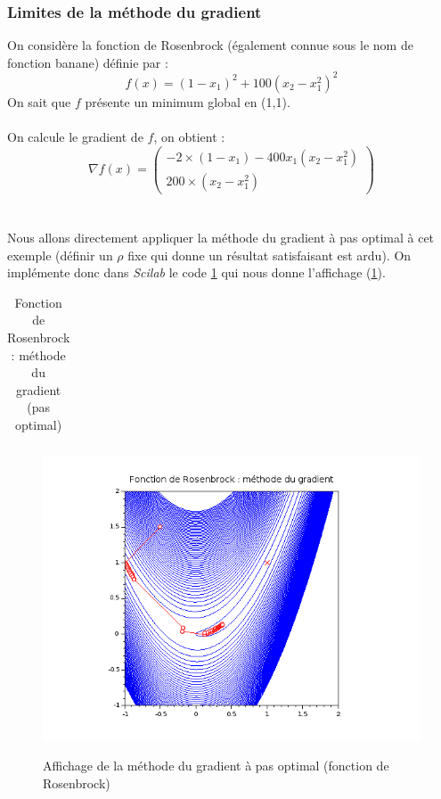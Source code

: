 \documentclass[a4paper,10pt]{report}
\begin{document}
\subsubsection{Limites de la méthode du gradient}
On considère la fonction de Rosenbrock (également connue sous le nom de fonction banane) définie par :
\abovedisplayskip=0mm
\begin{displaymath}
f(x) = (1-x_1)^2 + 100(x_2-x_1^2)^2
\end{displaymath}
On sait que $f$ présente un minimum global en (1,1).\\ \\
On calcule le gradient de $f$, on obtient :
\abovedisplayskip=0mm
\begin{displaymath}
\nabla f(x) = \left( \begin{array}{c} -2\times(1-x_1)-400x_1(x_2-x_1^2) \\ 200\times(x_2-x_1^2) \end{array} \right)
\end{displaymath}
\\ \\
Nous allons directement appliquer la méthode du gradient à pas optimal à cet exemple (définir un $\rho$ fixe qui donne un résultat satisfaisant est ardu). On implémente donc dans \textit{Scilab} le code \ref{banana_gradient} qui nous donne l'affichage (\ref{banana_graph1}).

\begin{table}[H]
\caption{Fonction de Rosenbrock : méthode du gradient (pas optimal)}
\begin{tabular}{l}

\label{banana_gradient}
\end{tabular}
\end{table}

\begin{figure}[H]
\centering
\caption{Affichage de la méthode du gradient à pas optimal (fonction de Rosenbrock)}
\includegraphics[width=13cm]{banana_1.png}
\label{banana_graph1}
\end{figure}
\end{document}
